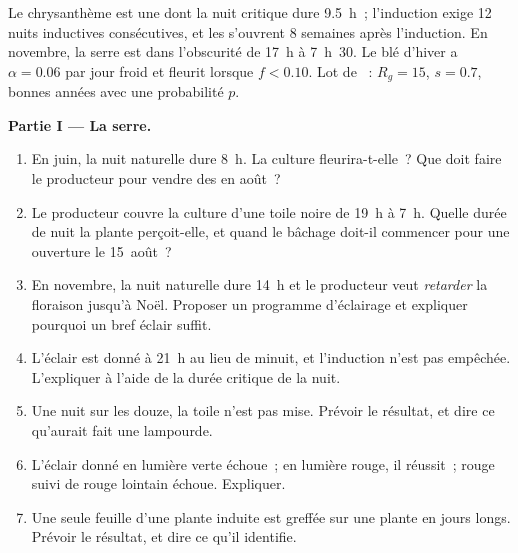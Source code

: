 \begin{problem}
\label{pb:b2:plant-flowering:1}
Le chrysanthème est une  dont la nuit critique
dure \qty{9.5}{h}~; l'induction exige \num{12} nuits inductives
consécutives, et les  s'ouvrent \num{8} semaines après
l'induction. En novembre, la serre est dans l'obscurité de 17~h à
7~h~30. Le blé d'hiver a $\alpha = 0.06$ par jour froid et fleurit
lorsque $f < 0.10$. Lot de ~: $R_g = 15$, $s = 0.7$, bonnes
années avec une probabilité $p$.

\medskip
\noindent\textbf{Partie I --- La serre.}
\begin{enumerate}
  \item En juin, la nuit naturelle dure \qty{8}{h}. La culture
        fleurira-t-elle~? Que doit faire le producteur pour vendre des
         en août~?
  \item Le producteur couvre la culture d'une toile noire de 19~h à
        7~h. Quelle durée de nuit la plante perçoit-elle, et quand le
        bâchage doit-il commencer pour une ouverture le 15~août~?
  \item En novembre, la nuit naturelle dure \qty{14}{h} et le producteur
        veut \emph{retarder} la floraison jusqu'à Noël. Proposer un
        programme d'éclairage et expliquer pourquoi un bref éclair
        suffit.
  \item L'éclair est donné à 21~h au lieu de minuit, et l'induction
        n'est pas empêchée. L'expliquer à l'aide de la durée critique de
        la nuit.
  \item Une nuit sur les douze, la toile n'est pas mise. Prévoir le
        résultat, et dire ce qu'aurait fait une lampourde.
  \item L'éclair donné en lumière verte échoue~; en lumière rouge, il
        réussit~; rouge suivi de rouge lointain échoue. Expliquer.
  \item Une seule feuille d'une plante induite est greffée sur une plante
        en jours longs. Prévoir le résultat, et dire ce qu'il identifie.
\end{enumerate}


\end{problem}
